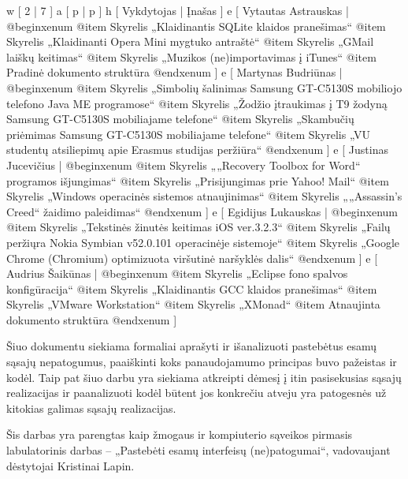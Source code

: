 
\xtable
{
  w [ 2  | 7 ]
  a [ p  | p ]
  h [ Vykdytojas | Įnašas ]
  e [ Vytautas Astrauskas 
  | @begin{xenum} 
      @item Skyrelis „Klaidinantis SQLite klaidos pranešimas“
      @item Skyrelis „Klaidinanti Opera Mini mygtuko antraštė“ 
      @item Skyrelis „GMail laiškų keitimas“
      @item Skyrelis „Muzikos (ne)importavimas į iTunes“
      @item Pradinė dokumento struktūra
    @end{xenum}
  ]
  e [ Martynas Budriūnas
  | @begin{xenum} 
      @item Skyrelis „Simbolių šalinimas Samsung GT-C5130S mobiliojo telefono Java ME programose“
      @item Skyrelis „Žodžio įtraukimas į T9 žodyną Samsung GT-C5130S mobiliajame telefone“
      @item Skyrelis „Skambučių priėmimas Samsung GT-C5130S mobiliajame telefone“
      @item Skyrelis „VU studentų atsiliepimų apie Erasmus studijas peržiūra“
    @end{xenum}
  ]
  e [ Justinas Jucevičius 
  | @begin{xenum} 
      @item Skyrelis „„Recovery Toolbox for Word“ programos išjungimas“
      @item Skyrelis „Prisijungimas prie Yahoo! Mail“
      @item Skyrelis „Windows operacinės sistemos atnaujinimas“
      @item Skyrelis „„Assassin's Creed“ žaidimo paleidimas“
    @end{xenum}
  ]
  e [ Egidijus Lukauskas 
  | @begin{xenum} 
      @item Skyrelis „Tekstinės žinutės keitimas iOS ver.3.2.3“
      @item Skyrelis „Failų peržiųra Nokia Symbian v52.0.101 operacinėje sistemoje“
      @item Skyrelis „Google Chrome (Chromium) optimizuota viršutinė naršyklės dalis“
    @end{xenum}
  ]
  e [ Audrius Šaikūnas 
  | @begin{xenum} 
      @item Skyrelis „Eclipse fono spalvos konfigūracija“
      @item Skyrelis „Klaidinantis GCC klaidos pranešimas“ 
      @item Skyrelis „VMware Workstation“
      @item Skyrelis „XMonad“
      @item Atnaujinta dokumento struktūra
    @end{xenum}
  ]
}

Šiuo dokumentu siekiama formaliai aprašyti ir išanalizuoti
pastebėtus esamų sąsajų nepatogumus, paaiškinti koks panaudojamumo
principas buvo pažeistas ir kodėl. Taip pat šiuo darbu yra siekiama
atkreipti dėmesį į itin pasisekusias sąsajų realizacijas ir
paanalizuoti kodėl būtent jos konkrečiu atveju yra patogesnės už
kitokias galimas sąsajų realizacijas.

Šis darbas yra parengtas kaip žmogaus ir kompiuterio sąveikos pirmasis labulatorinis darbas
– „Pastebėti esamų interfeisų (ne)patogumai“, vadovaujant dėstytojai Kristinai Lapin.
